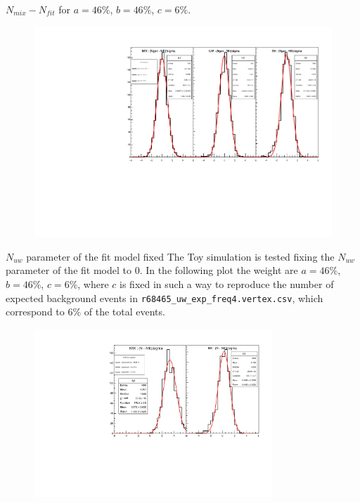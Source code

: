 \documentclass[9pt]{beamer}
\newcommand{\nologo}{\setbeamertemplate{logo}{}}
\begin{document}
\begin{frame}[noframenumbering]
\begin{center}
\end{center}
\end{frame}

{\nologo
\begin{frame}{$N_{mix} - N_{fit}$ for $a = 46\%$, $b = 46\%$, $c = 6\%$.}
\begin{figure}
\includegraphics[width = 1\textwidth]{N165/ToyNmix(46,46,6).pdf}
\end{figure}
\end{frame}
}

{
\begin{frame}{$N_{uw}$ parameter of the fit model fixed}
The Toy simulation is tested fixing the $N_{uw}$ parameter of the fit model to $0$. In the following plot the weight are $a = 46\%$, $b = 46\%$, $c = 6\%$, where $c$ is fixed in such a way to reproduce the number of expected background events in \texttt{r68465\_uw\_exp\_freq4.vertex.csv}, which correspond to $6\%$ of the total events.
\begin{figure}
\includegraphics[width = 0.8\textwidth]{N165/ToyNmixNbk,NuwFixed(46,46,6).pdf}
\end{figure}
\end{frame}
}
\end{document}
